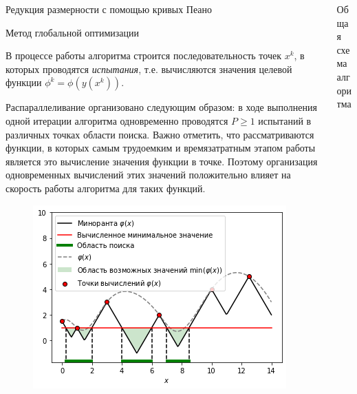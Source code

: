 \documentclass{beamer}
\begin{document}
\begin{frame}[t]
\begin{columns}[t]
\begin{column}[t]{0.47\paperwidth}
\begin{block}{Редукция размерности с помощью кривых Пеано}
\end{block}
\begin{block}{Метод глобальной оптимизации}

В процессе работы алгоритма строится последовательность точек \(x^k\), в которых проводятся \textit{испытания}, т.е. вычисляются значения целевой функции \(\phi^k=\phi(y(x^k))\). 

Распараллеливание организовано следующим образом: в ходе выполнения одной итерации алгоритма одновременно проводятся \(P \geq 1\) испытаний в различных точках области поиска. Важно отметить, что рассматриваются функции, в которых самым трудоемким и времязатратным этапом работы является это вычисление значения функции в точке. Поэтому организация одновременных вычислений этих значений положительно влияет на скорость работы алгоритма для таких функций. 

 \begin{minipage}[t]{.47\textwidth}
              \begin{figure}
                  \centering
                  \includegraphics[scale=2.05]{images/PlotGS_1.png}
              \end{figure}
              \end{minipage}
\end{block}
            
        \end{column}
        \begin{column}[t]{0.47\paperwidth}
          \begin{block}{Общая схема алгоритма}


\end{block}
\end{column}
\end{columns}
\end{frame}
\end{document}
